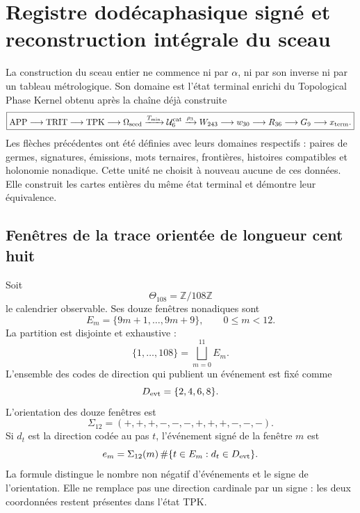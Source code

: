 
\chapter{Registre dodécaphasique signé et reconstruction intégrale du sceau}
\label{chap:registro-dodecafasico-hadamard-k}

La construction du sceau entier ne commence ni par \(\alpha\), ni par son inverse
ni par un tableau métrologique. Son domaine est l’état terminal enrichi
du Topological Phase Kernel obtenu après la chaîne déjà construite
\begin{equation}
 \boxed{
 \mathrm{APP}\longrightarrow\mathrm{TRIT}\longrightarrow\mathrm{TPK}
 \longrightarrow\Omega_{\rm seed}
 \xrightarrow{T_{\min}}\mathcal U_6^{\rm cat}
 \xrightarrow{\rho_3}W_{243}
 \longrightarrow w_{30}\longrightarrow R_{36}
 \longrightarrow G_9\longrightarrow x_{\rm term}.}
 \label{eq:cadena-upstream-registro-dodecafasico}
\end{equation}
Les flèches précédentes ont été définies avec leurs domaines respectifs :
paires de germes, signatures, émissions, mots ternaires, frontières,
histoires compatibles et holonomie nonadique. Cette unité ne choisit à nouveau
aucune de ces données. Elle construit les cartes entières du même état
terminal et démontre leur équivalence.

\section{Fenêtres de la trace orientée de longueur cent huit}

Soit
\[
 \Theta_{108}=\mathbb Z/108\mathbb Z
\]
le calendrier observable. Ses douze fenêtres nonadiques sont
\[
 E_m=\{9m+1,\ldots,9m+9\},
 \qquad 0\leq m<12.
\]
La partition est disjointe et exhaustive :
\[
 \{1,\ldots,108\}=\bigsqcup_{m=0}^{11}E_m.
\]
L’ensemble des codes de direction qui publient un événement est fixé comme
\[
 D_{\rm evt}=\{2,4,6,8\}.
\]
L’orientation des douze fenêtres est
\begin{equation}
 \Sigma_{12}=(+,+,+,-,-,-,+,+,+,-,-,-).
 \label{eq:signatura-doce-ventanas}
\end{equation}
Si \(d_t\) est la direction codée au pas \(t\), l’événement signé
de la fenêtre \(m\) est
\begin{equation}
 e_m=\Sigma_{12}(m)\,
 \#\{t\in E_m:d_t\in D_{\rm evt}\}.
 \label{eq:evento-firmado-ventana}
\end{equation}
La formule distingue le nombre non négatif d’événements et le signe de
l’orientation. Elle ne remplace pas une direction cardinale par un signe : les deux
coordonnées restent présentes dans l’état TPK.

